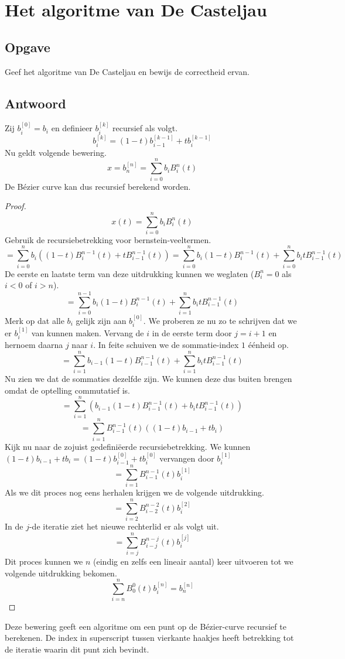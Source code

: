 \documentclass[examenvragen.tex]{subfiles}
\begin{document}
\section{Het algoritme van De Casteljau}
\subsection{Opgave}
Geef het algoritme van De Casteljau en bewijs de correctheid ervan.

\subsection{Antwoord}
Zij $b_{i}^{[0]} = b_{i}$ en definieer $b_{i}^{[k]}$ recursief als volgt.
\[
b_{i}^{[k]}
=
(1-t)b_{i-1}^{[k-1]} + tb_{i}^{[k-1]}
\]
Nu geldt volgende bewering.
\[
x = b_{n}^{[n]} = \sum_{i=0}^{n}b_iB_{i}^{n}(t)
\]
De B\'ezier curve kan dus recursief berekend worden.
\begin{proof}
\[
x(t) = \sum_{i=0}^{n}b_iB_{i}^{n}(t)
\]
Gebruik de recursiebetrekking voor bernstein-veeltermen.
\[
= \sum_{i=0}^{n}b_i
\left( 
(1-t)B^{n-1}_{i}(t) + tB^{n-1}_{i-1}(t)
\right)
= 
\sum_{i=0}^{n}b_i
(1-t)B^{n-1}_{i}(t) + 
\sum_{i=0}^{n}b_it
B^{n-1}_{i-1}(t)
\]
De eerste en laatste term van deze uitdrukking kunnen we weglaten ($B_{i}^{n} = 0$ als $i < 0$ of $i > n$).
\[
= 
\sum_{i=0}^{n-1}b_i
(1-t)B^{n-1}_{i}(t) + 
\sum_{i=1}^{n}b_it
B^{n-1}_{i-1}(t)
\]
Merk op dat alle $b_i$ gelijk zijn aan $b_i^{[0]}$. We proberen ze nu zo te schrijven dat we er $b_i^{[1]}$ van kunnen maken. Vervang de $i$ in de eerste term door $j=i+1$ en hernoem daarna $j$ naar $i$. In feite schuiven we de sommatie-index $1$ \'e\'enheid op.
\[
= 
\sum_{i=1}^{n}b_{i-1}
(1-t)B^{n-1}_{i-1}(t) + 
\sum_{i=1}^{n}b_it
B^{n-1}_{i-1}(t)
\]
Nu zien we dat de sommaties dezelfde zijn. We kunnen deze dus buiten brengen omdat de optelling commutatief is.
\[
= 
\sum_{i=1}^{n}
\left(
b_{i-1}(1-t)B^{n-1}_{i-1}(t)
+ 
b_itB^{n-1}_{i-1}(t)
\right)
\]
\[
= 
\sum_{i=1}^{n}
B^{n-1}_{i-1}(t)
\left(
(1-t)b_{i-1}
+ 
tb_i
\right)
\]
Kijk nu naar de zojuist gedefini\"eerde recursiebetrekking. We kunnen $(1-t)b_{i-1} + tb_i = (1-t)b_{i-1}^{[0]} + tb_i^{[0]}$ vervangen door $b_{i}^{[1]}$
\[
= 
\sum_{i=1}^{n}
B^{n-1}_{i-1}(t)
b_{i}^{[1]}
\]
Als we dit proces nog eens herhalen krijgen we de volgende uitdrukking.
\[
= 
\sum_{i=2}^{n}
B^{n-2}_{i-2}(t)
b_{i}^{[2]}
\]
In de $j$-de iteratie ziet het nieuwe rechterlid er als volgt uit.
\[
= 
\sum_{i=j}^{n}
B^{n-j}_{i-j}(t)
b_{i}^{[j]}
\]
Dit proces kunnen we $n$ (eindig en zelfs een lineair aantal) keer uitvoeren tot we volgende uitdrukking bekomen.
\[
\sum_{i=n}^{n}
B^{0}_{0}(t)
b_{i}^{[n]}
= b_{n}^{[n]}
\]
\end{proof}
\noindent Deze bewering geeft een algoritme om een punt op de B\'ezier-curve recursief te berekenen. De index in superscript tussen vierkante haakjes heeft betrekking tot de iteratie waarin dit punt zich bevindt.
\end{document}
